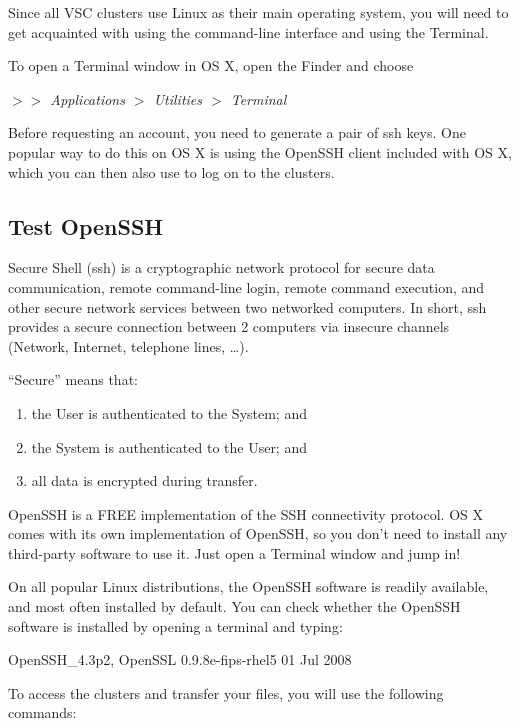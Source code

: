   Since all VSC clusters use Linux as their main operating system, you will
  need to get acquainted with using the command-line interface and using the
  Terminal.

  To open a Terminal window in OS X, open the Finder and choose

  \emph{$>$$>$ Applications $>$ Utilities $>$ Terminal}

  Before requesting an account, you need to generate a pair of ssh keys. One
  popular way to do this on OS X is using the OpenSSH client included with OS
  X, which you can then also use to log on to the clusters.

  \subsection{Test OpenSSH}
  \label{sec:test-openssh}

  Secure Shell (ssh) is a cryptographic network protocol for secure data
  communication, remote command-line login, remote command execution, and other
  secure network services between two networked computers. In short, ssh
  provides a secure connection between 2 computers via insecure channels
  (Network, Internet, telephone lines, \ldots).

  ``Secure'' means that:

  \begin{enumerate}
    \item  the User is authenticated to the System; and
    \item  the System is authenticated to the User; and
    \item  all data is encrypted during transfer.
  \end{enumerate}

  OpenSSH is a FREE implementation of the SSH connectivity protocol. OS X comes
  with its own implementation of OpenSSH, so you don't need to install any
  third-party software to use it. Just open a Terminal window and jump in!

  On all popular Linux distributions, the OpenSSH software is readily
  available, and most often installed by default. You can check whether the
  OpenSSH software is installed by opening a terminal and typing:

  \begin{prompt}
  OpenSSH_4.3p2, OpenSSL 0.9.8e-fips-rhel5 01 Jul 2008
  \end{prompt}

  To access the clusters and transfer your files, you will use the following commands:

